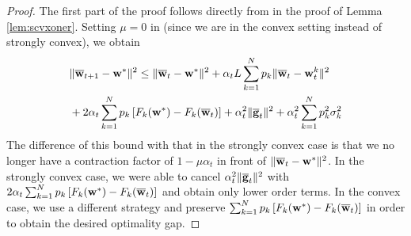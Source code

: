 \begin{proof}
    The first part of the proof follows directly from \eq{\ref{eq:common one step}} in the proof of Lemma \ref{lem:scvxoner}. Setting $\mu=0$ in \eq{\ref{eq:common one step}} (since we are in the convex setting instead of strongly convex), we obtain 
    \begin{align*}
	&\|{\overline{\mathbf{w}}}_{t+1}-{\mathbf{w}}^{\ast}\|^{2}  \leq\|{\overline{\mathbf{w}}}_{t}-{\mathbf{w}}^{\ast}\|^{2}+\alpha_{t}L\sum_{k=1}^{N}p_{k}\|{\overline{\mathbf{w}}}_{t}-{\mathbf{w}}_{t}^{k}\|^{2} \\ 
	& +2\alpha_{t}\sum_{k=1}^{N}p_{k}\left[F_{k}({\mathbf{w}}^{\ast})-F_{k}({\overline{\mathbf{w}}}_{t})\right]+\alpha_{t}^{2}\|{\overline{\mathbf{g}}}_{t}\|^{2}+\alpha_{t}^{2}\sum_{k=1}^{N}p_{k}^{2}\sigma_{k}^{2}
	\end{align*}
	The difference of this bound with that in the strongly convex case
	is that we no longer have a contraction factor of $1-\mu\alpha_t$ in front of $\|{\overline{\mathbf{w}}}_{t}-{\mathbf{w}}^{\ast}\|^{2}$.
	In the strongly convex case, we were able to cancel $\alpha_{t}^{2}\|{\overline{\mathbf{g}}}_{t}\|^{2}$
	with $2\alpha_{t}\sum_{k=1}^{N}p_{k}\left[F_{k}({\mathbf{w}}^{\ast})-F_{k}({\overline{\mathbf{w}}}_{t})\right]$
	and obtain only lower order terms. In the convex case, we use a different
	strategy and preserve $\sum_{k=1}^{N}p_{k}\left[F_{k}({\mathbf{w}}^{\ast})-F_{k}({\overline{\mathbf{w}}}_{t})\right]$
	in order to obtain the desired optimality gap. 
	

\end{proof}

